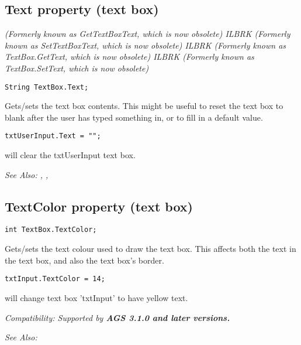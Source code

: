 \subsection{Text property (text box)}\label{TextBox.Text}%

\it{(Formerly known as GetTextBoxText, which is now obsolete)} ILBRK
\it{(Formerly known as SetTextBoxText, which is now obsolete)} ILBRK
\it{(Formerly known as TextBox.GetText, which is now obsolete)} ILBRK
\it{(Formerly known as TextBox.SetText, which is now obsolete)}

\begin{verbatim}
String TextBox.Text;
\end{verbatim}

Gets/sets the text box contents. This might be useful to reset
the text box to blank after the user has typed something in, or to fill
in a default value.

\begin{verbatim}
txtUserInput.Text = "";
\end{verbatim}
will clear the txtUserInput text box.

\it{See Also:} ,
,


\subsection{TextColor property (text box)}\label{TextBox.TextColor}%

\begin{verbatim}
int TextBox.TextColor;
\end{verbatim}
Gets/sets the text colour used to draw the text box. This affects both the text in the text
box, and also the text box's border.

\begin{verbatim}
txtInput.TextColor = 14;
\end{verbatim}

will change text box 'txtInput' to have yellow text.

\it{Compatibility:} Supported by \bf{AGS 3.1.0} and later versions.

\it{See Also:} 



